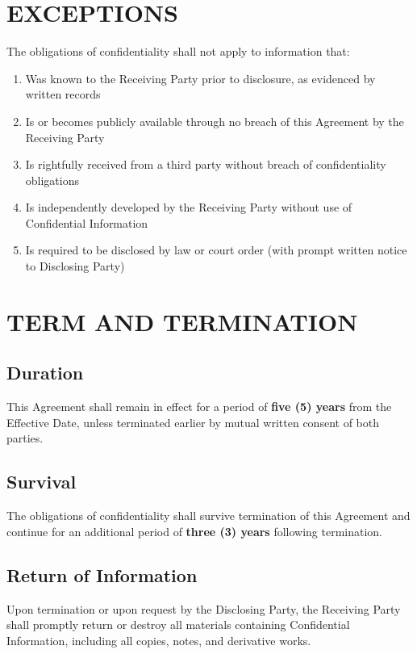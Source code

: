 \documentclass[11pt,letterpaper]{article}
\begin{document}
\section{EXCEPTIONS}

The obligations of confidentiality shall not apply to information that:

\begin{enumerate}[leftmargin=0.5cm]
    \item Was known to the Receiving Party prior to disclosure, as evidenced by written records
    \item Is or becomes publicly available through no breach of this Agreement by the Receiving Party
    \item Is rightfully received from a third party without breach of confidentiality obligations
    \item Is independently developed by the Receiving Party without use of Confidential Information
    \item Is required to be disclosed by law or court order (with prompt written notice to Disclosing Party)
\end{enumerate}

\section{TERM AND TERMINATION}

\subsection{Duration}
This Agreement shall remain in effect for a period of \textbf{five (5) years} from the Effective Date, unless terminated earlier by mutual written consent of both parties.

\subsection{Survival}
The obligations of confidentiality shall survive termination of this Agreement and continue for an additional period of \textbf{three (3) years} following termination.

\subsection{Return of Information}
Upon termination or upon request by the Disclosing Party, the Receiving Party shall promptly return or destroy all materials containing Confidential Information, including all copies, notes, and derivative works.
\end{document}
